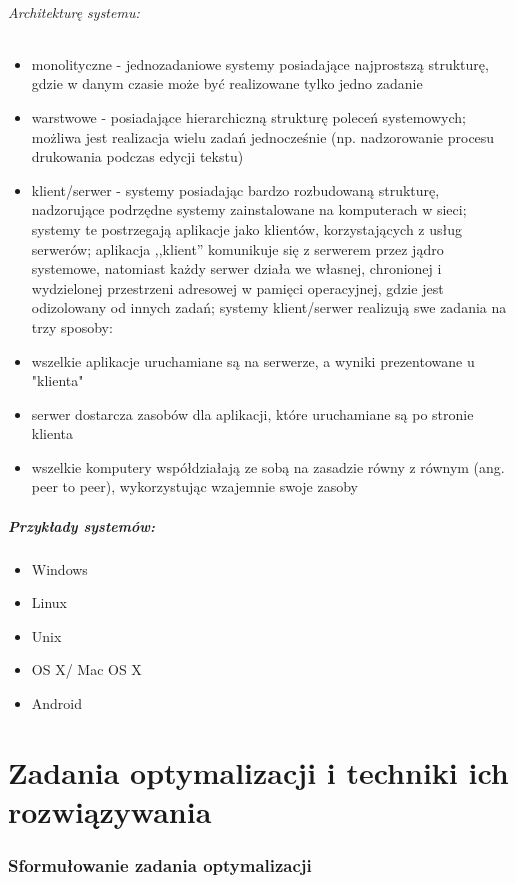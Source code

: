 \documentclass[]{report}
\begin{document}
\subparagraph{Architekturę systemu:}
\begin{itemize}

\item monolityczne - jednozadaniowe systemy posiadające najprostszą strukturę, gdzie w danym czasie może być realizowane tylko jedno zadanie
\item warstwowe - posiadające hierarchiczną strukturę poleceń systemowych; możliwa jest realizacja wielu zadań jednocześnie (np. nadzorowanie procesu drukowania podczas edycji tekstu)
\item klient/serwer - systemy posiadając bardzo rozbudowaną strukturę, nadzorujące podrzędne systemy zainstalowane na komputerach w sieci; systemy te postrzegają aplikacje jako klientów, korzystających z usług serwerów; aplikacja ,,klient'' komunikuje się z serwerem przez jądro systemowe, natomiast każdy serwer działa we własnej, chronionej i wydzielonej przestrzeni adresowej w pamięci operacyjnej, gdzie jest odizolowany od innych zadań; systemy klient/serwer realizują swe zadania na trzy sposoby:
\item wszelkie aplikacje uruchamiane są na serwerze, a wyniki prezentowane u "klienta"
\item serwer dostarcza zasobów dla aplikacji, które uruchamiane są po stronie klienta
\item wszelkie komputery współdziałają ze sobą na zasadzie równy z równym (ang. peer to peer), wykorzystując wzajemnie swoje zasoby
\end{itemize}

\paragraph{Przykłady systemów:}
\begin{itemize}
\item Windows
\item Linux
\item Unix
\item OS X/ Mac OS X
\item Android
\end{itemize}

\chapter{Zadania optymalizacji i techniki ich rozwiązywania}

\subsection{Sformułowanie zadania optymalizacji}
\end{document}
